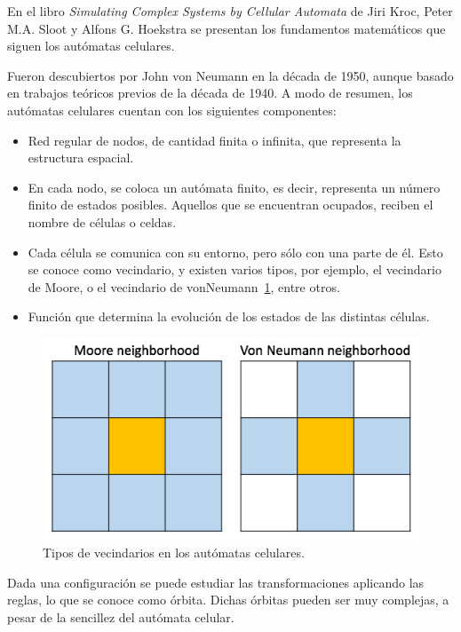 En el libro \textit{Simulating Complex Systems by Cellular Automata} de Jiri Kroc, Peter M.A. Sloot y Alfons G. Hoekstra
\cite{cellular-automata} se presentan los fundamentos matemáticos que siguen los autómatas celulares.

Fueron descubiertos por John von Neumann en la década de 1950, aunque basado en trabajos teóricos previos de la
década de 1940. A modo de resumen, los autómatas celulares cuentan con los siguientes componentes:

\begin{itemize}
    \item Red regular de nodos, de cantidad finita o infinita, que representa la estructura espacial.
    \item En cada nodo, se coloca un autómata finito, es decir, representa un número finito de estados posibles.
    Aquellos que se encuentran ocupados, reciben el nombre de células o celdas.
    \item Cada célula se comunica con su entorno, pero sólo con una parte de él. Esto se conoce como vecindario,
    y existen varios tipos, por ejemplo, el vecindario de Moore, o el vecindario de vonNeumann~\ref{fig:neighboor}, entre otros.
    \item Función que determina la evolución de los estados de las distintas células.
\end{itemize}

\begin{figure}[h]
\centering
\includegraphics[scale=0.6]{figures/automata_neighboor}
\caption{Tipos de vecindarios en los autómatas celulares.}
\label{fig:neighboor}
\end{figure}

Dada una configuración se puede estudiar las transformaciones aplicando las reglas,
lo que se conoce como órbita. Dichas órbitas pueden ser muy complejas, a pesar de
la sencillez del autómata celular.

